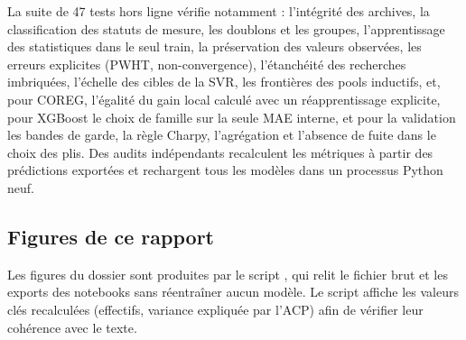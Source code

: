 La suite de 47 tests hors ligne vérifie notamment : l'intégrité des archives,
la classification des statuts de mesure, les doublons et les groupes, l'apprentissage
des statistiques dans le seul train, la préservation des valeurs observées, les
erreurs explicites (PWHT, non-convergence), l'étanchéité des recherches imbriquées,
l'échelle des cibles de la SVR, les frontières des pools inductifs, et, pour COREG,
l'égalité du gain local calculé avec un réapprentissage explicite, pour XGBoost
le choix de famille sur la seule MAE interne, et pour la validation les bandes de
garde, la règle Charpy, l'agrégation et l'absence de fuite dans le choix des plis. Des audits
indépendants recalculent les métriques à partir des prédictions exportées et
rechargent tous les modèles dans un processus Python neuf.

\subsection{Figures de ce rapport}

Les figures du dossier  sont produites par le script
, qui relit le fichier brut et
les exports des notebooks sans réentraîner aucun modèle. Le script affiche les
valeurs clés recalculées (effectifs, variance expliquée par l'ACP) afin de vérifier
leur cohérence avec le texte.

